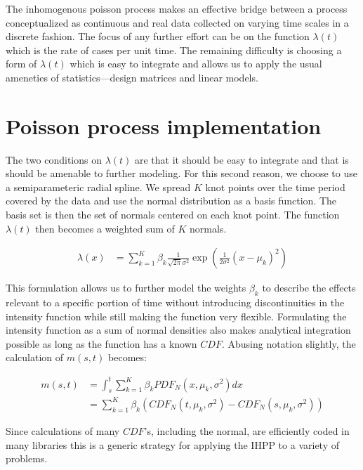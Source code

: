 The inhomogenous poisson process makes an effective bridge between a
process conceptualized as continuous and real data collected on varying
time scales in a discrete fashion.  The focus of any further effort
can be on the function $\lambda(t)$ which is the rate of cases per
unit time.  The remaining difficulty is choosing a form of $\lambda(t)$
which is easy to integrate and allows us to apply the usual ameneties
of statistics---design matrices and linear models.

\section{Poisson process implementation}\label{sec:ihpp-implementation}

The two conditions on $\lambda(t)$ are that it should be easy to
integrate and that is should be amenable to further modeling.  For
this second reason, we choose to use a semiparameteric radial spline.
We spread $K$ knot points over the time period covered by the data
and use the normal distribution as a basis function.  The basis set is
then the set of normals centered on each knot point.  The function
$\lambda(t)$ then becomes a weighted sum of $K$ normals.

\begin{align}
\lambda(x) &= \sum_{k=1}^K \beta_k \frac{1}{\sqrt{2\pi}\sigma^2} \exp(\frac{1}{2\sigma^2}\left(x-\mu_k\right)^2)
\end{align}

This formulation allows us to further model the weights $\beta_k$ to
describe the effects relevant to a specific portion of time without
introducing discontinuities in the intensity function while still making
the function very flexible.  Formulating the intensity function as a sum
of normal densities also makes analytical integration possible as long
as the function has a known $CDF$.  Abusing notation slightly, the 
calculation of $m(s,t)$ becomes:

\begin{align}
m(s,t) &= \int_s^t \sum_{k=1}^K \beta_k PDF_N(x,\mu_k,\sigma^2) dx \\
			 &= \sum_{k=1}^K \beta_k \left(CDF_N(t,\mu_k,\sigma^2) - CDF_N(s,\mu_k,\sigma^2) \right)
\end{align}

Since calculations of many $CDF$'s, including the normal, are
efficiently coded in many libraries this is a generic strategy for
applying the IHPP to a variety of problems.  

















